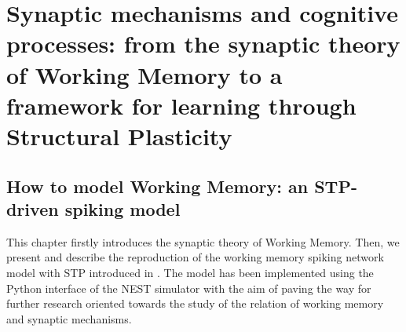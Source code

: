 \documentclass[a4paper, 12pt, twoside, openright]{book}
\begin{document}
\part{Synaptic mechanisms and cognitive processes: from the synaptic theory of Working Memory to a framework for learning through Structural Plasticity}
\label{part:II}


\chapter{\textbf{How to model Working Memory: an STP-driven spiking model}}
\label{chapter:STP_WM_model}

\begin{tcolorbox}[colback=white,colframe=DarkRed,title=\textbf{Summary}]
This chapter firstly introduces the synaptic theory of Working Memory. Then, we present and describe the reproduction of the working memory spiking network model with STP introduced in \cite{Mongillo2008}. The model has been implemented using the Python interface of the NEST simulator with the aim of paving the way for further research oriented towards the study of the relation of working memory and synaptic mechanisms.
\end{tcolorbox}
\end{document}
